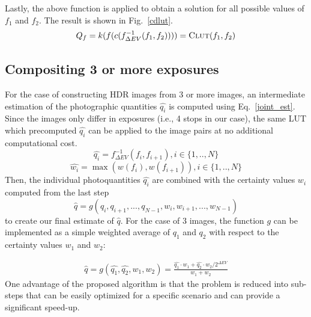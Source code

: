 \newcommand{\CLUT}{\mbox{\textsc{Clut}}}

Lastly, the above function is applied to obtain a solution for all
possible values of $f_1$ and $f_2$. The result
is shown in Fig.~\ref{cdlut}.
\begin{equation}
  \label{combined_function}
  Q_f = k(f(c(f^{-1}_{\Delta EV}(f_1,f_2)))) = \CLUT{}(f_1, f_2)
\end{equation}

\subsection{Compositing 3 or more exposures} \label{comp3_set} 

For the case of constructing HDR images from 3 or more images, an intermediate estimation of the 
photographic quantities
$\hat{q_i}$ is computed using Eq.~\ref{joint_est}. Since the images only differ in
exposures (i.e., 4 stops in our case), the same LUT which precomputed
 $\hat{q_i}$ can be applied to the image pairs at no additional
computational cost.
\begin{equation}
\hat{q_i}=f^{-1}_{\Delta EV}(f_i, f_{i+1}), i \in \{1,..,N\}
\end{equation}
\begin{equation}
\hat{w_i}=\max(w(f_i), w(f_{i+1})), i \in \{1,..,N\}
\end{equation}
Then, the individual photoquantities $\hat{q_i}$ are combined with the
certainty values $w_i$ computed from the last step
\begin{equation}
\hat{q}=g(q_i, q_{i+1}, ... , q_{N-1}, w_i, w_{i+1},...,w_{N-1})
\end{equation}
to create our final estimate of $\hat{q}$.  For the case of 3 images,
the function $g$ can be implemented as a simple weighted average of 
 $q_1$ and $q_2$ with respect to the certainty values $w_1$ and
$w_2$:
 
\begin{equation}
\begin{split}
  \hat{q} = g(\hat{q_1}, \hat{q_2}, w_1, w_2) = \frac{\hat{q_1} \cdot
    w_1 + \hat{q_2} \cdot w_2 / 2^{\Delta EV}}{w_1+w_2}
\end{split}
\end{equation}
One advantage of the proposed algorithm is that the problem is reduced
into sub-steps that can be easily optimized for a specific scenario and
can provide a significant speed-up.

